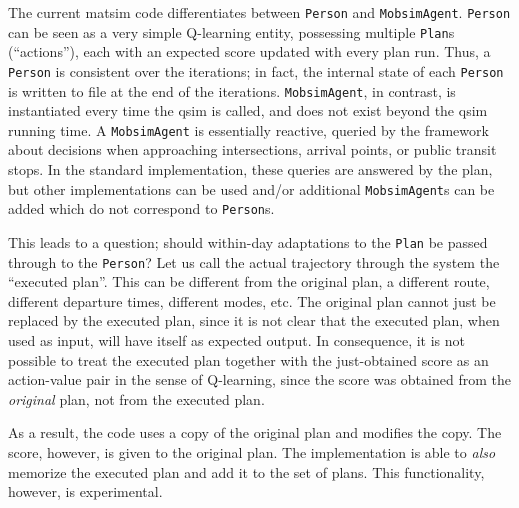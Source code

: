 The current \gls{matsim} code differentiates between \lstinline$Person$ and \lstinline$MobsimAgent$.  
%
\lstinline$Person$ can be seen as a very simple Q-learning entity, possessing multiple \lstinline$Plan$s (``actions''), each with an expected score updated with every plan run. Thus, a \lstinline$Person$ is consistent over the iterations; in fact, the internal state of each \lstinline$Person$ is written to file at the end of the iterations.
%
\lstinline$MobsimAgent$, in contrast, is instantiated every time the \gls{qsim} is called, and does not exist beyond the \gls{qsim} running time. A \lstinline$MobsimAgent$ is essentially reactive, queried by the framework about decisions when approaching intersections, arrival points, or public transit stops. In the standard implementation, these queries are answered by the plan, but other implementations can be used and/or additional \lstinline$MobsimAgent$s can be added which do not correspond to \lstinline$Person$s.
%

This leads to a question; should within-day adaptations to the \lstinline$Plan$ be passed through to the \lstinline$Person$? Let us call the actual trajectory through the system the ``executed plan''. This can be different from the original plan, \ie a different route, different departure times, different modes, etc. The original plan cannot just be replaced by the executed plan, since it is not clear that the executed plan, when used as input, will have itself as expected output. In consequence, it is not possible to treat the executed plan together with the just-obtained score as an action-value pair in the sense of Q-learning, since the score was obtained from the \emph{original} plan, not from the executed plan.

As a result, the code uses a copy of the original plan and modifies the copy. The score, however, is given to the original plan. The implementation is able to 
% 
\emph{also} memorize the executed plan and add it to the set of plans. This functionality, however, is experimental.


%

